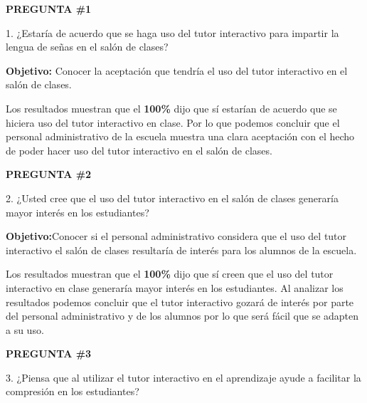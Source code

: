 \documentclass[12pt]{report}%
\begin{document}
\textbf{PREGUNTA \#1}

1. ¿Estaría de acuerdo que se haga uso del tutor interactivo para impartir la lengua de señas en el salón de clases? 

\textbf {Objetivo:} Conocer la aceptación que tendría el uso del tutor interactivo en el salón de clases. 


\begin{center}
\end{center}


Los resultados muestran que el \textbf{ 100\%}  dijo que sí estarían de acuerdo que se hiciera uso del tutor interactivo en clase. Por lo que podemos concluir que el personal administrativo de la escuela muestra una clara aceptación con el hecho de poder hacer uso del tutor interactivo en el salón de clases. 

\newpage
\textbf{PREGUNTA \#2}

2. ¿Usted cree que el uso del tutor interactivo en el salón de clases generaría mayor interés en los estudiantes?

\textbf{Objetivo:}Conocer si el personal administrativo considera que el uso del tutor interactivo el salón de clases resultaría de interés para los alumnos de la escuela.


\begin{center}
\end{center}


Los resultados muestran que el \textbf{ 100\%}  dijo que sí creen que el uso del tutor interactivo en clase generaría mayor interés en los estudiantes. Al analizar los resultados podemos concluir que el tutor interactivo gozará de interés por parte del personal administrativo y de los alumnos por lo que será fácil que se adapten a su uso.



\newpage
\textbf{PREGUNTA \#3}

3. ¿Piensa que al utilizar el tutor interactivo en el aprendizaje ayude a facilitar la compresión en los estudiantes?
\end{document}
